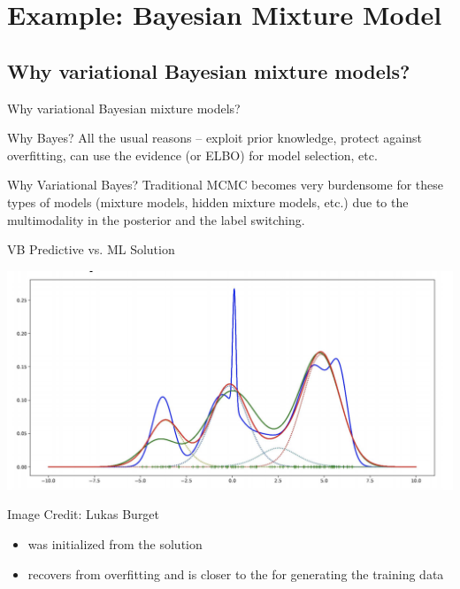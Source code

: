 \documentclass[10pt]{beamer}
\begin{document}
\section{Example: Bayesian Mixture Model}


\subsection{Why variational Bayesian mixture models?} 

\begin{frame}{Why variational Bayesian mixture models?}

\begin{block}{Why Bayes?}
All the usual reasons -- exploit prior knowledge,  protect against overfitting, can use the evidence (or ELBO) for model selection, etc.
\end{block}
\vfill
\begin{block}{Why Variational Bayes?}
Traditional MCMC becomes very burdensome for these types of models {\tiny (mixture models, hidden mixture models, etc.)} due to the multimodality in the posterior and the label switching. 
\end{block}	
\end{frame}

\begin{frame}{VB Predictive vs. ML Solution}

\begin{center}
\includegraphics[width=.9\textwidth]{images/ml_vs_vb}
\end{center}
\hfill \tiny{Image Credit: Lukas Burget} \normalsize

\begin{itemize}
\item {} was initialized from the  solution 
\item {} recovers from  overfitting and is closer to the  for generating the training data
\end{itemize}

\end{frame}
\end{document}
